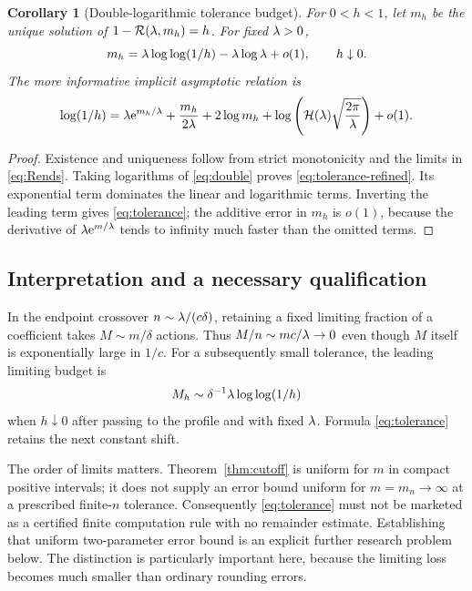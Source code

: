 \documentclass[11pt,a4paper]{article}
\numberwithin{equation}{section}
\newtheorem{corollary}[theorem]{Corollary}
\theoremstyle{definition}
\theoremstyle{remark}
\newcommand{\HH}{\mathcal H}\newcommand{\RR}{\mathcal R}
\begin{document}
\begin{corollary}[Double-logarithmic tolerance budget]\label{cor:tolerance}
For \(0<h<1\), let \(m_h\) be the unique solution of
\(1-\RR(\la,m_h)=h\). For fixed \(\lambda>0\),
\begin{equation}\label{eq:tolerance}
 m_h=\lambda\log\log(1/h)-\lambda\log\lambda+o(1),\qquad h\downarrow0.
\end{equation}
The more informative implicit asymptotic relation is
\begin{equation}\label{eq:tolerance-refined}
 \log(1/h)=\la\ee^{m_h/\la}+\frac{m_h}{2\la}
       +2\log m_h
       +\log\left(\HH(\la)\sqrt{\frac{2\pi}\la}\right)+o(1).
\end{equation}
\end{corollary}
\begin{proof}
Existence and uniqueness follow from strict monotonicity and the limits
in \eqref{eq:Rends}. Taking logarithms of \eqref{eq:double} proves
\eqref{eq:tolerance-refined}. Its exponential term dominates the
linear and logarithmic terms. Inverting the leading term gives
\eqref{eq:tolerance}; the additive error in \(m_h\) is \(o(1)\), because
the derivative of \(\lambda\mathrm e^{m/\lambda}\) tends to infinity much faster than
the omitted terms.
\end{proof}

\subsection{Interpretation and a necessary qualification}
In the endpoint crossover \(n\sim\lambda/(c\delta)\), retaining a fixed
limiting fraction of a coefficient takes \(M\sim m/\delta\) actions.
Thus \(M/n\sim mc/\lambda\to0\) even though \(M\) itself is exponentially
large in \(1/c\). For a subsequently small tolerance, the leading
limiting budget is
\[
 M_h\sim\delta^{-1}\lambda\log\log(1/h)
\]
when \(h\downarrow0\) after passing to the profile and with fixed
\(\lambda\). Formula \eqref{eq:tolerance} retains the next constant shift.

The order of limits matters. Theorem~\ref{thm:cutoff} is uniform for
\(m\) in compact positive intervals; it does not supply an error bound
uniform for \(m=m_n\to\infty\) at a prescribed finite-\(n\) tolerance.
Consequently \eqref{eq:tolerance} must not be marketed as a certified
finite computation rule with no remainder estimate. Establishing that
uniform two-parameter error bound is an explicit further research
problem below. The distinction is particularly important here, because
the limiting loss becomes much smaller than ordinary rounding errors.
\end{document}
